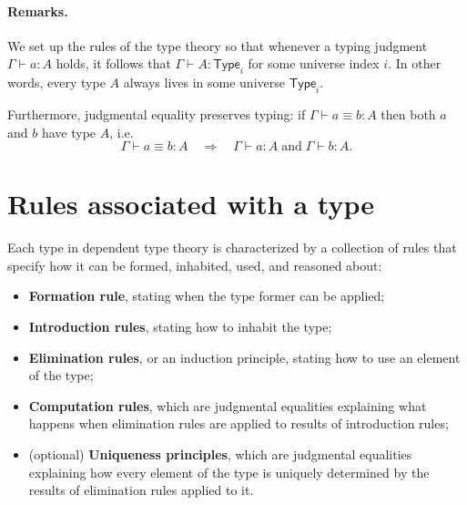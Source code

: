 \documentclass{article}
\newcommand{\Type}{\ensuremath{\mathsf{Type}}}
\newcommand{\judg}[3]{#1 \vdash #2 : #3}   %
\newcommand{\jdeq}{\equiv}                 %
\newcommand{\teq}[4]{#1 \vdash #2 \jdeq #3 : #4} %
\newcommand{\rulename}[1]{\textsc{#1}}
\begin{document}
\paragraph{Remarks.}
We set up the rules of the type theory so that whenever a typing judgment
\(\judg{\Gamma}{a}{A}\) holds, it follows that \(\judg{\Gamma}{A}{\Type_i}\)
for some universe index \(i\).  
In other words, every type \(A\) always lives in some universe \(\Type_i\).

Furthermore, judgmental equality preserves typing:  
if \(\teq{\Gamma}{a}{b}{A}\) then both \(a\) and \(b\) have type \(A\), i.e.
\[
\teq{\Gamma}{a}{b}{A} \quad\Rightarrow\quad
\judg{\Gamma}{a}{A} \;\text{and}\; \judg{\Gamma}{b}{A}.
\]



\section{Rules associated with a type}

Each type in dependent type theory is characterized by a collection of rules that specify how it can be formed, inhabited, used, and reasoned about:

\begin{itemize}
  \item \textbf{Formation rule}, stating when the type former can be applied;
  \item \textbf{Introduction rules}, stating how to inhabit the type;
  \item \textbf{Elimination rules}, or an induction principle, stating how to use an element of the type;
  \item \textbf{Computation rules}, which are judgmental equalities explaining what happens when elimination rules are applied to results of introduction rules;
  \item (optional) \textbf{Uniqueness principles}, which are judgmental equalities explaining how every element of the type is uniquely determined by the results of elimination rules applied to it.
\end{itemize}
\end{document}
